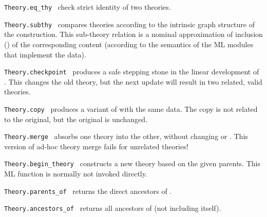 \begin{isabellebody}
\begin{isamarkuptext}
\begin{description}
  \item \verb|Theory.eq_thy|~ check strict
  identity of two theories.

  \item \verb|Theory.subthy|~ compares theories
  according to the intrinsic graph structure of the construction.
  This sub-theory relation is a nominal approximation of inclusion
  () of the corresponding content (according to the
  semantics of the ML modules that implement the data).

  \item \verb|Theory.checkpoint|~ produces a safe
  stepping stone in the linear development of .  This
  changes the old theory, but the next update will result in two
  related, valid theories.

  \item \verb|Theory.copy|~ produces a variant of  with the same data.  The copy is not related to the original,
  but the original is unchanged.

  \item \verb|Theory.merge|~ absorbs one theory
  into the other, without changing  or .
  This version of ad-hoc theory merge fails for unrelated theories!

  \item \verb|Theory.begin_theory|~ constructs
  a new theory based on the given parents.  This ML function is
  normally not invoked directly.

  \item \verb|Theory.parents_of|~ returns the direct
  ancestors of .

  \item \verb|Theory.ancestors_of|~ returns all
  ancestors of  (not including  itself).


\end{description}
\end{isamarkuptext}
\end{isabellebody}
